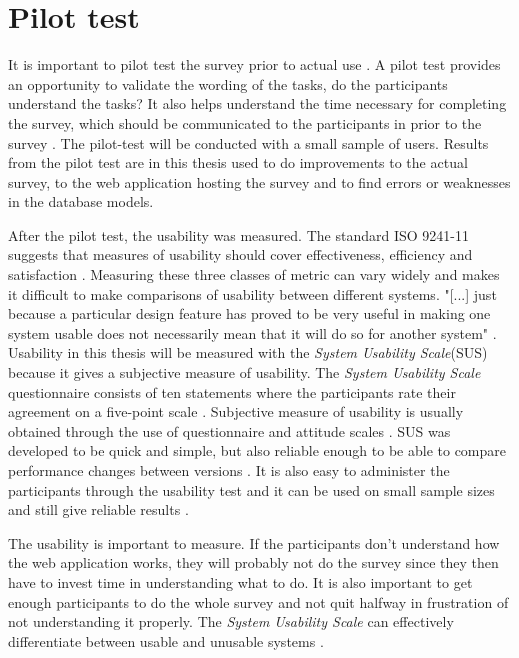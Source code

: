 \section{Pilot test}
It is important to pilot test the survey prior to actual use \citep{Ben2009}. A pilot test provides an opportunity to validate the wording of the tasks, do the participants understand the tasks? It also helps understand the time necessary for completing the survey, which should be communicated to the participants in prior to the survey \citep{Schade2015}. The pilot-test will be conducted with a small sample of users. Results from the pilot test are in this thesis used to do improvements to the actual survey, to the web application hosting the survey and to find errors or weaknesses in the database models.

After the pilot test, the usability was measured. The standard ISO 9241-11 suggests that measures of usability should cover effectiveness, efficiency and satisfaction \citep{ISO1998}. Measuring these three classes of metric can vary widely and makes it difficult to make comparisons of usability between different systems. "[...] just because a particular design feature has proved to be very useful in making one system usable does not necessarily mean that it will do so for another system" \citep{Brooke1996}. Usability in this thesis will be measured with the \textit{System Usability Scale}(SUS) because it gives a subjective measure of usability. The \textit{System Usability Scale} questionnaire consists of ten statements where the participants rate their agreement on a five-point scale \citep{Ben2009}. Subjective measure of usability is usually obtained through the use of questionnaire and attitude scales \citep{Brooke1996}. SUS was developed to be quick and simple, but also reliable enough to be able to compare performance changes between versions \citep{Brooke1996}. It is also easy to administer the participants through the usability test and it can be used on small sample sizes and still give reliable results \citep{Affairs2013}.  

The usability is important to measure. If the participants don't understand how the web application works, they will probably not do the survey since they then have to invest time in understanding what to do. %
It is also important to get enough participants to do the whole survey and not quit halfway in frustration of not understanding it properly. The \textit{System Usability Scale} can effectively differentiate between usable and unusable systems \citep{Affairs2013}. 

